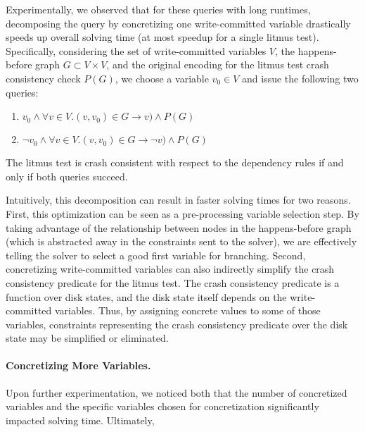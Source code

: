 Experimentally, we observed that for these queries with long runtimes,
decomposing the query by concretizing one write-committed variable
drastically speeds up overall solving time
(at most \splitvariablebestspeedup \times speedup for a single litmus test).
Specifically, considering the set of write-committed variables $V$,
the happens-before graph $G\subset V\times V$,
and the original encoding for the litmus test crash consistency check $P(G)$,
we choose a variable $v_0\in V$ and issue the following two queries:
\begin{enumerate}
  \item $v_0 \wedge \forall v\in V. (v, v_0)\in G \rightarrow v) \wedge P(G)$
  \item $\neg v_0 \wedge \forall v\in V. (v, v_0)\in G \rightarrow \neg v) \wedge P(G)$
\end{enumerate}
The litmus test is crash consistent with respect to the dependency rules
if and only if both queries succeed.

Intuitively, this decomposition can result in faster solving times for two reasons.
First, this optimization can be seen as a pre-processing variable selection step.
By taking advantage of the relationship between nodes in the happens-before graph
(which is abstracted away in the constraints sent to the solver),
we are effectively telling the solver to select a good first variable for branching.
Second, concretizing write-committed variables can also indirectly simplify the
crash consistency predicate for the litmus test.
The crash consistency predicate is a function over disk states,
and the disk state itself depends on the write-committed variables.
Thus, by assigning concrete values to some of those variables,
constraints representing the crash consistency predicate over the disk state
may be simplified or eliminated.

\paragraph{Concretizing More Variables.}
Upon further experimentation, we noticed both that the number of
concretized variables and the specific variables chosen for concretization
significantly impacted solving time.
Ultimately, %



